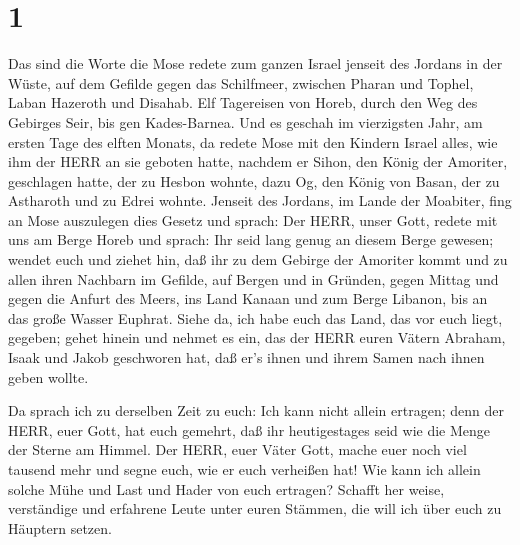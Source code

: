 \hypertarget{section}{%
\section{1}\label{section}}

 Das sind die Worte die Mose redete zum ganzen Israel
jenseit des Jordans in der Wüste, auf dem Gefilde gegen das Schilfmeer,
zwischen Pharan und Tophel, Laban Hazeroth und Disahab.  Elf
Tagereisen von Horeb, durch den Weg des Gebirges Seir, bis gen
Kades-Barnea.  Und es geschah im vierzigsten Jahr, am ersten
Tage des elften Monats, da redete Mose mit den Kindern Israel alles, wie
ihm der HERR an sie geboten hatte,  nachdem er Sihon, den
König der Amoriter, geschlagen hatte, der zu Hesbon wohnte, dazu Og, den
König von Basan, der zu Astharoth und zu Edrei wohnte. 
Jenseit des Jordans, im Lande der Moabiter, fing an Mose auszulegen dies
Gesetz und sprach:  Der HERR, unser Gott, redete mit uns am
Berge Horeb und sprach: Ihr seid lang genug an diesem Berge gewesen;
 wendet euch und ziehet hin, daß ihr zu dem Gebirge der
Amoriter kommt und zu allen ihren Nachbarn im Gefilde, auf Bergen und in
Gründen, gegen Mittag und gegen die Anfurt des Meers, ins Land Kanaan
und zum Berge Libanon, bis an das große Wasser Euphrat. 
Siehe da, ich habe euch das Land, das vor euch liegt, gegeben; gehet
hinein und nehmet es ein, das der HERR euren Vätern Abraham, Isaak und
Jakob geschworen hat, daß er's ihnen und ihrem Samen nach ihnen geben
wollte.

 Da sprach ich zu derselben Zeit zu euch: Ich kann nicht
allein ertragen;  denn der HERR, euer Gott, hat euch
gemehrt, daß ihr heutigestages seid wie die Menge der Sterne am Himmel.
 Der HERR, euer Väter Gott, mache euer noch viel tausend
mehr und segne euch, wie er euch verheißen hat!  Wie kann
ich allein solche Mühe und Last und Hader von euch ertragen?
 Schafft her weise, verständige und erfahrene Leute unter
euren Stämmen, die will ich über euch zu Häuptern setzen.


